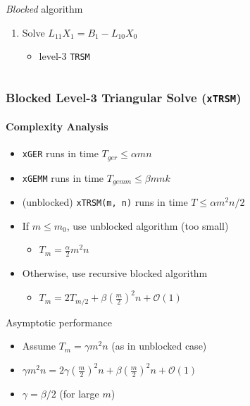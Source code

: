 \documentclass[xcolor={rgb,x11names,svgnames},rgb,x11names,svgnames]{beamer}
\newcommand{\bigO}[1]{\ensuremath{\mathcal{O}\left( #1 \right)} }
\begin{document}
\begin{frame}[label=trsm]
\begin{columns}
\begin{column}{5.5cm}
\begin{block}{\emph{Blocked} algorithm}
\begin{enumerate}
   \item<7-> Solve $L_{11} X_1 = B_{1} - L_{10} X_{0}$
     \begin{itemize}
     \item level-3 \texttt{TRSM}
     \end{itemize}
   \end{enumerate}
 \end{block}

\end{column}
\end{columns}

\end{frame}


\begin{frame}[label=trsm,fragile]
  \frametitle{\textbf{Blocked} Level-3 Triangular Solve (\texttt{xTRSM})}
  \framesubtitle{Complexity Analysis}
  
  \begin{itemize}
  \item \texttt{xGER} runs in time $T_{ger} \leq \alpha m n$
  \item \texttt{xGEMM} runs in time $T_{gemm} \leq \beta m n k$
  \item (unblocked) \texttt{xTRSM(m, n)} runs in time $T \leq \alpha m^2 n / 2$
  \item If $m \leq m_0$, use unblocked algorithm \hfill (too small)
    \begin{itemize}
    \item $T_{m} = \frac{\alpha}{2} {m}^2 n$
    \end{itemize}

  \item Otherwise, use recursive blocked algorithm
    \begin{itemize}
    \item $T_{m} = 2 T_{m/2} + \beta\left(\frac{m}{2}\right)^2 n + \bigO{1}$
    \end{itemize}

  \end{itemize}

  \begin{block}{Asymptotic performance}
    \begin{itemize}
    \item Assume $T_m = \gamma m^2 n$ \hfill (as in unblocked case)
    \item $\gamma m^2 n = 2\gamma\left(\frac{m}{2}\right)^2 n + \beta\left(\frac{m}{2}\right)^2 n + \bigO{1}$
    \item $\gamma = \beta / 2$ \hfill (for large $m$)
    \end{itemize}
  \end{block}
  
\end{frame}
\end{document}
